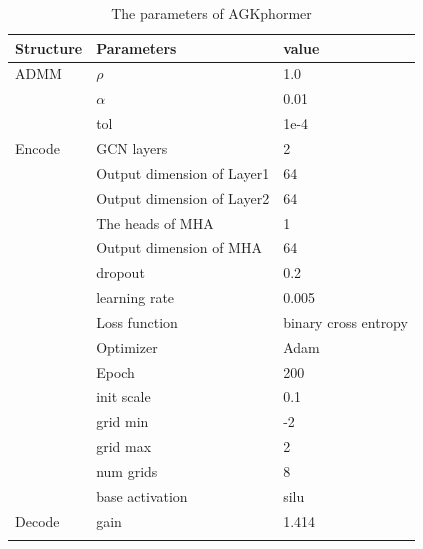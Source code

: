 \documentclass[lettersize,journal]{IEEEtran}
\begin{document}
\begin{table}[htbp]
	\centering
	\vspace{-3mm} %
	\caption{The parameters of AGKphormer}
	\begin{tabular}{lll}
		\toprule
		\textbf{Structure} & \textbf{Parameters} & \textbf{value} \\
		\midrule
		ADMM & \(\rho\) & 1.0 \\
		& \(\alpha\) & 0.01 \\
		& tol & 1e-4 \\
		
		Encode & GCN layers & 2 \\
		& Output dimension of Layer1 & 64 \\
		& Output dimension of Layer2 & 64 \\
		& The heads of MHA & 1 \\
		& Output dimension of MHA & 64 \\
		& dropout & 0.2 \\
		& learning rate & 0.005 \\
		& Loss function &binary cross entropy \\
		& Optimizer & Adam \\
		& Epoch & 200 \\
		& init scale & 0.1 \\
		& grid min & -2 \\
		& grid max & 2 \\
		& num grids & 8 \\
		& base activation & silu \\
		
		Decode & gain & 1.414\\
		
		\bottomrule
		\vspace{-3mm} %
		\label{parameter_t}
	\end{tabular}
\end{table}
\end{document}
